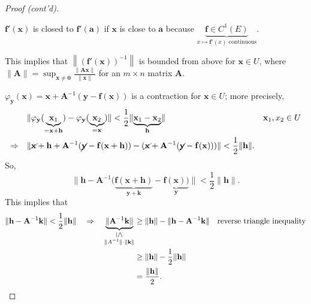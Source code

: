 \documentclass[letterpaper, reqno,11pt]{article}
\begin{document}
\begin{proof}[Proof (cont'd)]
  \begin{observation}
    \normalfont $\mathbf f'(\mathbf x)$ is closed to $\mathbf f'(\mathbf a)$ if $\mathbf x$ is close to $\mathbf a$ because $\underbrace{\mathbf f \in C^1(E)}_\text{$x \mapsto \mathbf f'(x)$ continuous}$.
  \end{observation}
  
  \noindent This implies that $\left\lVert (\mathbf f'(\mathbf x))^{-1} \right\rVert$ is bounded from above for $\mathbf x \in U$, where $\lVert \mathbf A \rVert = \sup_{\mathbf x \neq \mathbf 0} \frac{\lVert \mathbf A \mathbf x \rVert}{\lVert \mathbf x \rVert}$ for an $m \times n$ matrix $\mathbf A$.

  \medskip

   $\varphi_{\mathbf y} (\mathbf x) = \mathbf x + \mathbf A^{-1} (\mathbf y - \mathbf f(\mathbf x))$ is a contraction for $\mathbf x \in U$; more precisely,
  \begin{align*}
    & \lVert \varphi_{\mathbf y}(\underbrace{\mathbf x_1}_{= \mathbf x + \mathbf h}) - \varphi_{\mathbf y}(\underbrace{\mathbf x_2}_{= \mathbf x}) \rVert < \frac{1}{2} \lVert \underbrace{\mathbf x_1 - \mathbf x_2}_{\mathbf h} \rVert && \mathbf x_1, x_2 \in U \\
    \Rightarrow \quad & \lVert \cancel{\mathbf x} + \mathbf h + \mathbf A^{-1} (\cancel{\mathbf y} - \mathbf f(\mathbf x + \mathbf h)) - (\cancel{\mathbf x} + \mathbf A^{-1}(\cancel{\mathbf y} - \mathbf f(\mathbf x))) \rVert < \frac{1}{2} \lVert \mathbf h \rVert.
  \end{align*}
  So,
  \[ \lVert \mathbf h - \mathbf A^{-1}(\underbrace{\mathbf f(\mathbf x + \mathbf h)}_{\mathbf y + \mathbf k} - \underbrace{\mathbf f(\mathbf x))}_{\mathbf y} \rVert < \frac{1}{2} \lVert \mathbf h \rVert. \]
  This implies that
  \begin{align*}
    \lVert \mathbf h - \mathbf A^{-1} \mathbf k \rVert < \frac{1}{2} \lVert \mathbf h \rVert \quad \Rightarrow \quad \underbrace{\lVert \mathbf A^{-1} \mathbf k \rVert}_{\substack{\rotatebox[origin=c]{270}{$\leq$} \\ \lVert A^{-1} \rVert \cdot \lVert \mathbf k \rVert}} &\geq \lVert \mathbf h \rVert - \lVert \mathbf h - \mathbf A^{-1} \mathbf k \rVert && \text{reverse triangle inequality} \\
    &\geq \lVert \mathbf h \rVert - \frac{1}{2} \lVert \mathbf h \rVert \\
    &= \frac{\lVert \mathbf h \rVert}{2}.
  \end{align*}


\end{proof}
\end{document}
